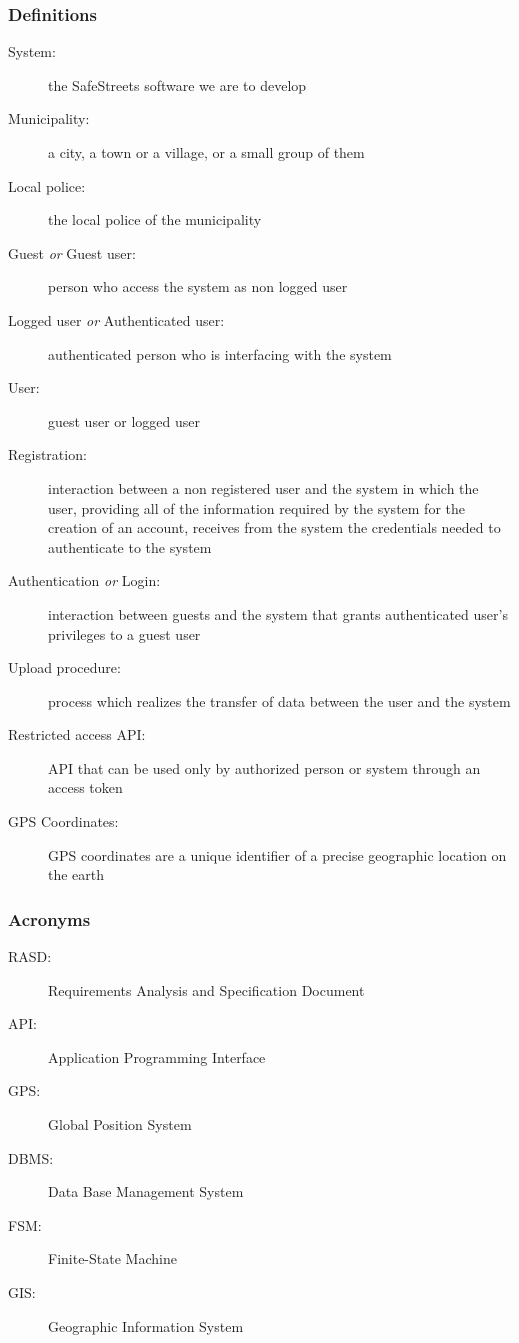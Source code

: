 	\subsubsection{Definitions}
	\begin{description}
		\item[System:]the SafeStreets software we are to develop
		\item[Municipality:] a city, a town or a village, or a small group of them
		\item[Local police:] the local police of the municipality
		\item[Guest \emph{or} Guest user:] person who access the system as non logged user
		\item[Logged user \emph{or} Authenticated user:] authenticated person who is interfacing with the system
		\item[User:] guest user or logged user
		\item[Registration:]  interaction between a non registered user and the system in which the user, providing all of the information required by the system for the creation of an account, receives from the system the credentials needed to authenticate to the system
		\item[Authentication \emph{or} Login:] interaction between guests and the system that grants authenticated user's privileges to a guest user
		\item[Upload procedure:] process which realizes the transfer of data between the user and the system
		\item[Restricted access API:] API that can be used only by authorized person or system through an access token
		\item[GPS Coordinates:] GPS coordinates are a unique identifier of a precise geographic location on the earth
	\end{description}
\subsubsection{Acronyms}
	\begin{description}
		\item [RASD:] Requirements Analysis and Specification Document
		\item [API:] Application Programming Interface
		\item [GPS:] Global Position System
		\item [DBMS:] Data Base Management System
		\item [FSM:] Finite-State Machine
		\item [GIS:] Geographic Information System
	\end{description}
